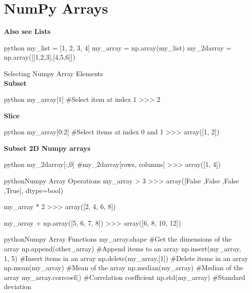 \section{NumPy Arrays}

\begin{myblock}{}
\begin{textbox}{}
\textbf{Also see Lists}
\end{textbox}

\begin{codebox}{python}{}
my_list = [1, 2, 3, 4]
my_array = np.array(my_list)
my_2darray = np.array([[1,2,3],[4,5,6]])
\end{codebox}

\begin{myblock}{Selecting Numpy Array Elements}
\\
\textbf{Subset}
\begin{codebox}{python}{}
my_array[1]  #Select item at index 1
>>> 2
\end{codebox}

\textbf{Slice}
\begin{codebox}{python}{}
my_array[0:2]  #Select items at index 0 and 1
>>> array([1, 2])
\end{codebox}

\textbf{Subset 2D Numpy arrays}
\begin{codebox}{python}{}
my_2darray[:,0]  #my_2darray[rows, columns]
>>> array([1, 4])
\end{codebox}
\end{myblock}

\begin{codebox}{python}{Numpy Array Operations}
my_array > 3
>>> array([False ,False ,False ,True], dtype=bool)

my_array * 2
>>> array([2, 4, 6, 8])

my_array + np.array([5, 6, 7, 8])
>>> array([6, 8, 10, 12])
\end{codebox}

\begin{codebox}{python}{Numpy Array Functions}
my_array.shape  #Get the dimensions of the array
np.append(other_array)  #Append items to an array
np.insert(my_array, 1, 5)  #Insert items in an array
np.delete(my_array,[1])  #Delete items in an array
np.mean(my_array)  #Mean of the array
np.median(my_array)  #Median of the array
my_array.corrcoef()  #Correlation coefficient
np.std(my_array)  #Standard deviation
\end{codebox}

\end{myblock}

